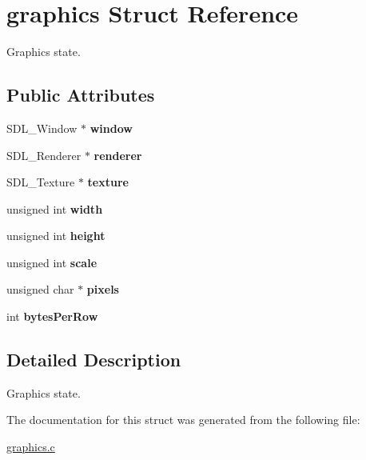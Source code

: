 \hypertarget{structgraphics}{}\section{graphics Struct Reference}
\label{structgraphics}


Graphics state.  


\subsection*{Public Attributes}
\begin{DoxyCompactItemize}
\item 
\mbox{\label{structgraphics_aa80505ac81e1fcec11842c9da3554ac7}} 
S\+D\+L\+\_\+\+Window $\ast$ {\bfseries window}
\item 
\mbox{\label{structgraphics_a1cce7704fc556b8a92393d3ef67f47d1}} 
S\+D\+L\+\_\+\+Renderer $\ast$ {\bfseries renderer}
\item 
\mbox{\label{structgraphics_ab2169dffe37dc1d899e0eab9b600ab5b}} 
S\+D\+L\+\_\+\+Texture $\ast$ {\bfseries texture}
\item 
\mbox{\label{structgraphics_a04412a10e5b6ca8520cbb39460b9e0a2}} 
unsigned int {\bfseries width}
\item 
\mbox{\label{structgraphics_a261da5d6e6841f1c5481cc52dd76f733}} 
unsigned int {\bfseries height}
\item 
\mbox{\label{structgraphics_a8690c42e45ceb0aecd4c9b47c7f3c06f}} 
unsigned int {\bfseries scale}
\item 
\mbox{\label{structgraphics_ad709dff92e44da59ba499206137017fb}} 
unsigned char $\ast$ {\bfseries pixels}
\item 
\mbox{\label{structgraphics_af007c0e920302661c2a135b9f9d21a93}} 
int {\bfseries bytes\+Per\+Row}
\end{DoxyCompactItemize}


\subsection{Detailed Description}
Graphics state. 

The documentation for this struct was generated from the following file\+:\begin{DoxyCompactItemize}
\item 
\hyperlink{graphics_8c}{graphics.\+c}\end{DoxyCompactItemize}
